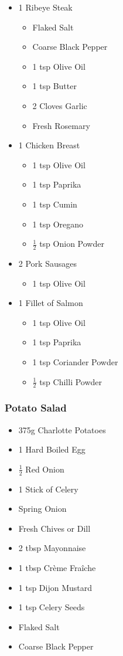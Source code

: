\documentclass[11pt, english]{article}
\begin{document}
	\begin{itemize}
        \setlength\itemsep{0cm}
                \item 1 Ribeye Steak
		\begin{itemize}
			\item Flaked Salt
			\item Coarse Black Pepper
			\item 1 tsp Olive Oil
			\item 1 tsp Butter
			\item 2 Cloves Garlic
			\item Fresh Rosemary
		\end{itemize}
		\item 1 Chicken Breast
		\begin{itemize}
			\item 1 tsp Olive Oil
			\item 1 tsp Paprika
			\item 1 tsp Cumin
			\item 1 tsp Oregano
			\item $\frac{1}{2}$ tsp Onion Powder 
		\end{itemize}
		\item 2 Pork Sausages
		\begin{itemize}
			\item 1 tsp Olive Oil
		\end{itemize}
		\item 1 Fillet of Salmon
		\begin{itemize}
			\item 1 tsp Olive Oil
			\item 1 tsp Paprika
			\item 1 tsp Coriander Powder
			\item $\frac{1}{2}$ tsp Chilli Powder
		\end{itemize}
        \end{itemize}

		\subsubsection*{Potato Salad}

	\begin{itemize}
        \setlength\itemsep{0cm}
                \item 375g Charlotte Potatoes
		\item 1 Hard Boiled Egg
		\item $\frac{1}{2}$ Red Onion
		\item 1 Stick of Celery
		\item Spring Onion
		\item Fresh Chives or Dill
		\item 2 tbsp Mayonnaise
		\item 1 tbsp Cr\`{e}me Fra\^{i}che
                \item 1 tsp Dijon Mustard
                \item 1 tsp Celery Seeds
                \item Flaked Salt
                \item Coarse Black Pepper
        \end{itemize}
\end{document}
